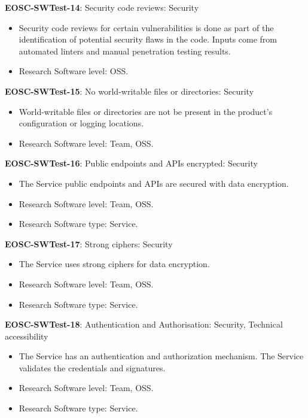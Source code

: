 \textbf{EOSC-SWTest-14}: Security code reviews: Security

\begin{itemize}
    \item Security code reviews for certain vulnerabilities is done as part of the identification of potential security flaws in the code. Inputs  come from automated linters and manual penetration testing results. \cite{gillies_modelling_1992,shepherdson_cessda_2019,orviz_set_2017}
    \item Research Software level: OSS.
\end{itemize}

\textbf{EOSC-SWTest-15}: No world-writable files or directories: Security

\begin{itemize}
    \item World-writable files or directories are not be present in the product's configuration or logging locations. \cite{orviz_set_2017}
    \item Research Software level: Team, OSS.
\end{itemize}

\textbf{EOSC-SWTest-16}: Public endpoints and APIs encrypted: Security

\begin{itemize}
    \item The Service public endpoints and APIs are secured with data encryption. \cite{orviz_fernandez_eosc-synergy_2020}
    \item Research Software level: Team, OSS.
    \item Research Software type: Service.
\end{itemize}

\textbf{EOSC-SWTest-17}: Strong ciphers: Security

\begin{itemize}
    \item The Service uses strong ciphers for data encryption. \cite{orviz_fernandez_eosc-synergy_2020}
    \item Research Software level: Team, OSS.
    \item Research Software type: Service.
\end{itemize}

\textbf{EOSC-SWTest-18}: Authentication and Authorisation: Security, Technical accessibility

\begin{itemize}
    \item The Service has an authentication and authorization mechanism. The Service validates the credentials and signatures. \cite{shepherdson_cessda_2019,orviz_fernandez_eosc-synergy_2020}
    \item Research Software level: Team, OSS.
    \item Research Software type: Service.
\end{itemize}

